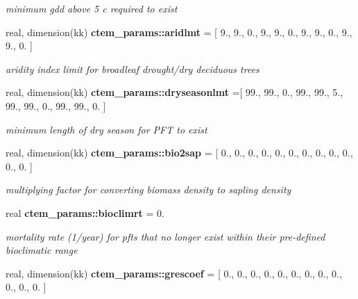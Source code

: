 \begin{DoxyCompactItemize}
\begin{DoxyCompactList}\small\item\em minimum gdd above 5 c required to exist \end{DoxyCompactList}\item 
\hypertarget{namespacectem__params_a5fb0d8e073e3b32005845f96d7ee9eb5}{}real, dimension(kk) {\bfseries ctem\+\_\+params\+::aridlmt} = \mbox{[} 9., 9., 0., 9., 9., 0., 9., 9., 0., 9., 9., 0. \mbox{]}\label{namespacectem__params_a5fb0d8e073e3b32005845f96d7ee9eb5}

\begin{DoxyCompactList}\small\item\em aridity index limit for broadleaf drought/dry deciduous trees \end{DoxyCompactList}\item 
\hypertarget{namespacectem__params_af24fc4b3d8a43b3a8660e97fb81bce30}{}real, dimension(kk) {\bfseries ctem\+\_\+params\+::dryseasonlmt} =\mbox{[} 99., 99., 0., 99., 99., 5., 99., 99., 0., 99., 99., 0. \mbox{]}\label{namespacectem__params_af24fc4b3d8a43b3a8660e97fb81bce30}

\begin{DoxyCompactList}\small\item\em minimum length of dry season for P\+F\+T to exist \end{DoxyCompactList}\item 
\hypertarget{namespacectem__params_ad97be0dd9fb2c81974e6cb42433869ef}{}real, dimension(kk) {\bfseries ctem\+\_\+params\+::bio2sap} = \mbox{[} 0., 0., 0., 0., 0., 0., 0., 0., 0., 0., 0., 0. \mbox{]}\label{namespacectem__params_ad97be0dd9fb2c81974e6cb42433869ef}

\begin{DoxyCompactList}\small\item\em multiplying factor for converting biomass density to sapling density \end{DoxyCompactList}\item 
\hypertarget{namespacectem__params_a6b5937d5ed79accdf5415c1ab6e1bc48}{}real {\bfseries ctem\+\_\+params\+::bioclimrt} = 0.\label{namespacectem__params_a6b5937d5ed79accdf5415c1ab6e1bc48}

\begin{DoxyCompactList}\small\item\em mortality rate (1/year) for pfts that no longer exist within their pre-\/defined bioclimatic range \end{DoxyCompactList}\item 
\hypertarget{namespacectem__params_a693738e0e1e8f1ff84250383c571b23a}{}real, dimension(kk) {\bfseries ctem\+\_\+params\+::grescoef} = \mbox{[} 0., 0., 0., 0., 0., 0., 0., 0., 0., 0., 0., 0. \mbox{]}\label{namespacectem__params_a693738e0e1e8f1ff84250383c571b23a}


\end{DoxyCompactItemize}
